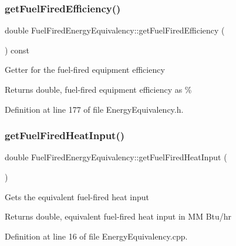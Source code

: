 \subsubsection{\texorpdfstring{get\+Fuel\+Fired\+Efficiency()}{getFuelFiredEfficiency()}}
{\footnotesize\ttfamily double Fuel\+Fired\+Energy\+Equivalency\+::get\+Fuel\+Fired\+Efficiency (\begin{DoxyParamCaption}{ }\end{DoxyParamCaption}) const\hspace{0.3cm}{\ttfamily [inline]}}

Getter for the fuel-\/fired equipment efficiency

\begin{DoxyReturn}{Returns}
double, fuel-\/fired equipment efficiency as \% 
\end{DoxyReturn}


Definition at line 177 of file Energy\+Equivalency.\+h.

\mbox{\label{class_fuel_fired_energy_equivalency_a6bf68595ca361dd4135d0c84c2fbe6d9}} 
\subsubsection{\texorpdfstring{get\+Fuel\+Fired\+Heat\+Input()}{getFuelFiredHeatInput()}}
{\footnotesize\ttfamily double Fuel\+Fired\+Energy\+Equivalency\+::get\+Fuel\+Fired\+Heat\+Input (\begin{DoxyParamCaption}{ }\end{DoxyParamCaption})}

Gets the equivalent fuel-\/fired heat input \begin{DoxyReturn}{Returns}
double, equivalent fuel-\/fired heat input in MM Btu/hr 
\end{DoxyReturn}


Definition at line 16 of file Energy\+Equivalency.\+cpp.

\mbox{\label{class_fuel_fired_energy_equivalency_a222836bfef1cb0caec0adafc2ef6b7ea}} 
